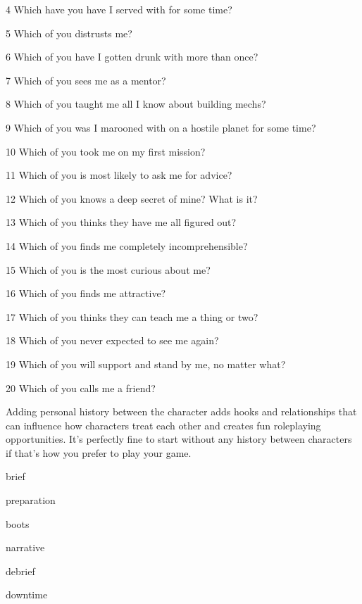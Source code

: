 4         Which have you have I served with for some time?

 5         Which of you distrusts me?

 6         Which of you have I gotten drunk with more than once?

 7         Which of you sees me as a mentor?

 8         Which of you taught me all I know about building mechs?

 9         Which of you was I marooned with on a hostile planet for some time?

10       Which of you took me on my first mission?

  11       Which of you is most likely to ask me for advice?

  12       Which of you knows a deep secret of mine? What is it?

  13       Which of you thinks they have me all figured out?

  14       Which of you finds me completely incomprehensible?

  15       Which of you is the most curious about me?

  16       Which of you finds me attractive?

  17       Which of you thinks they can teach me a thing or two?

  18       Which of you never expected to see me again?

  19       Which of you will support and stand by me, no matter what?

  20       Which of you calls me a friend?

Adding personal history between the character adds hooks and relationships that can influence
how characters treat each other and creates fun roleplaying opportunities. It’s perfectly fine to
start without any history between characters if that’s how you prefer to play your game.

{brief}

{preparation}

{boots}

{narrative}

{debrief}

{downtime}
